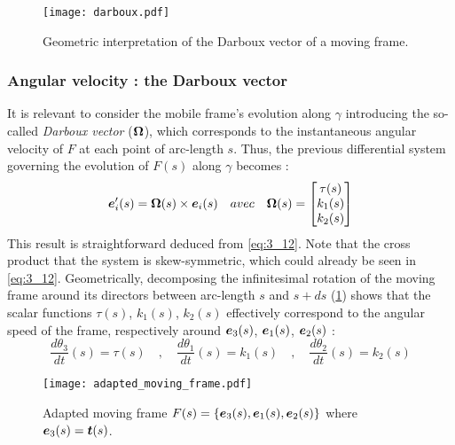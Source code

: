 
\begin{figure}[t]
\centering
\texttt{[image: darboux.pdf]}
\caption{Geometric interpretation of the Darboux vector of a moving frame.}
\label{fig:3_4}
\end{figure}

\subsubsection{Angular velocity : the Darboux vector}


It is relevant to consider the mobile frame's evolution along $\gamma$ introducing the so-called \emph{Darboux vector} ($\boldsymbol{\Omega}$), which corresponds to the instantaneous angular velocity of $F$ at each point of arc-length $s$. Thus, the previous differential system governing the evolution of $F(s)$ along $\gamma$ becomes :
\begin{equation}
	\boldsymbol{e}'_{i}(s) = \boldsymbol{\Omega}(s) \times \boldsymbol{e}_{i}(s)
	\quad avec \quad
	\boldsymbol{\Omega}(s)
	=
	\begin{bmatrix}
		\tau(s) \\
		k_1(s) \\
		k_2(s)
	\end{bmatrix}
\end{equation}
This result is straightforward deduced from \eqref{eq:3_12}. Note that the cross product  that the system is skew-symmetric, which could already be seen in \eqref{eq:3_12}.
Geometrically, decomposing the infinitesimal rotation of the moving frame around its directors between arc-length $s$ and $s+ds$ (\cref{fig:3_4}) shows that the scalar functions $\tau(s)$, $k_{1}(s)$, $k_{2}(s)$ effectively correspond to the angular speed of the frame, respectively around $\boldsymbol{e}_{3}(s)$, $\boldsymbol{e}_{1}(s)$, $\boldsymbol{e}_{2}(s)$ :
\begin{equation}
	\frac{d\theta_3}{dt}(s) = \tau(s)
	\quad,\quad
	\frac{d\theta_1}{dt}(s) = k_{1}(s)
	\quad,\quad
	\frac{d\theta_2}{dt}(s) = k_{2}(s)
\end{equation}

\begin{figure}[t]
\centering
\texttt{[image: adapted\_moving\_frame.pdf]}
\caption{Adapted moving frame $F(s) =\{\boldsymbol{e}_{3}(s),\boldsymbol{e}_{1}(s),\boldsymbol{e}_{2}(s)\}$ where $\boldsymbol{e}_3(s) = \boldsymbol{t}(s)$.}
\label{fig:3_5}
\end{figure}

